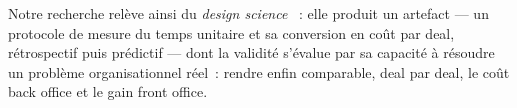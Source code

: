 Notre recherche relève ainsi du \textit{design science} \cite{hevner2004}~: elle produit
un artefact --- un protocole de mesure du temps unitaire et sa conversion en coût par
deal, rétrospectif puis prédictif --- dont la validité s'évalue par sa capacité à résoudre
un problème organisationnel réel~: rendre enfin comparable, deal par deal, le coût back
office et le gain front office.

\newpage

